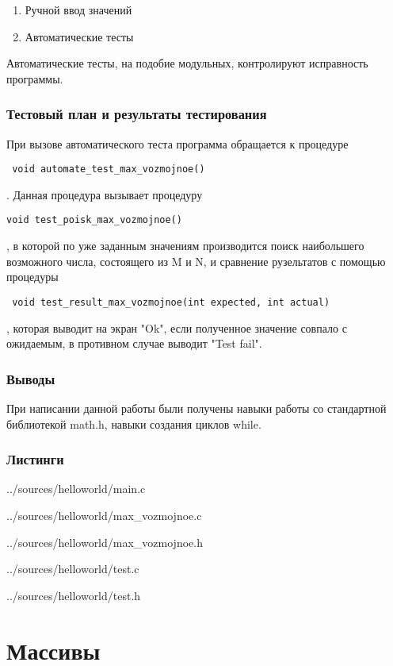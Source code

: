 \documentclass[12pt,a4paper]{report}
\begin{document}
\begin{enumerate}
\item Ручной ввод значений
\item Автоматические тесты
\end{enumerate}

Автоматические тесты, на подобие модульных, контролируют исправность программы.
\subsection{Тестовый план и результаты тестирования}
При вызове автоматического теста программа обращается к процедуре\begin{verbatim} void automate_test_max_vozmojnoe()\end{verbatim}. Данная процедура вызывает процедуру \begin{verbatim}void test_poisk_max_vozmojnoe()\end{verbatim}, в которой по уже заданным значениям производится поиск наибольшего возможного числа, состоящего из M и N, и сравнение рузельтатов с помощью процедуры\begin{verbatim} void test_result_max_vozmojnoe(int expected, int actual)\end{verbatim}, которая выводит на экран "Ok", если полученное значение совпало с ожидаемым, в противном случае выводит "Test fail".
\subsection{Выводы}
При написании данной работы были получены навыки работы со стандартной библиотекой math.h, навыки создания циклов while.
\subsection*{Листинги}

{../sources/helloworld/main.c}


{../sources/helloworld/max_vozmojnoe.c}


{../sources/helloworld/max_vozmojnoe.h}


{../sources/helloworld/test.c}


{../sources/helloworld/test.h}


\chapter{Массивы}
\end{document}
